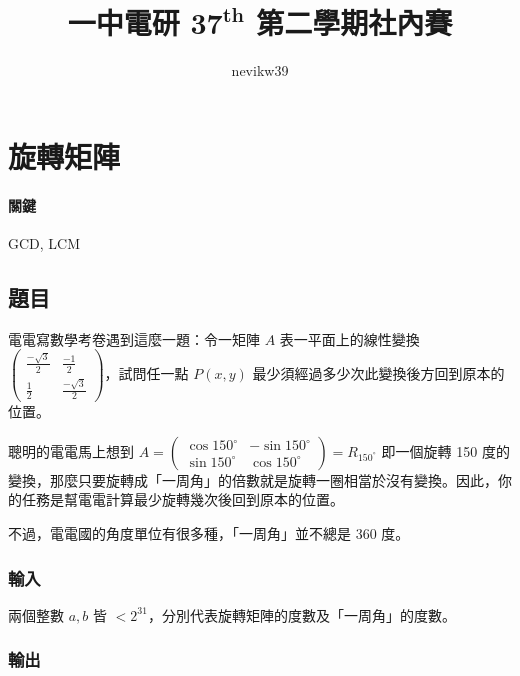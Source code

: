 \documentclass[a4paper,10pt]{article}
\title{\fontseries{b}一中電研 $\mathbf{37^{th}}$ 第二學期社內賽 \enspace {\huge\fontseries{eb}\selectfont 題目解析}}
\author{\fontshape{it}nevikw39}
\begin{document}
\maketitle

\begin{abstract}


\end{abstract}

\section{旋轉矩陣}

\paragraph{關鍵} GCD, LCM

\subsection{題目}

電電寫數學考卷遇到這麼一題：令一矩陣 $A$ 表一平面上的線性變換 $\begin{pmatrix} \frac{-\sqrt{3}}{2} & \frac{-1}{2}\\ \frac{1}{2} & \frac{-\sqrt{3}}{2} \end{pmatrix}$，試問任一點 $P(x, y)$ 最少須經過多少次此變換後方回到原本的位置。

聰明的電電馬上想到 $A = \begin{pmatrix} \cos 150^{\circ} & -\sin 150^{\circ}\\ \sin 150^{\circ} & \cos 150^{\circ} \end{pmatrix} = R_{150^{\circ}}$ 即一個旋轉 150 度的變換，那麼只要旋轉成「一周角」的倍數就是旋轉一圈相當於沒有變換。因此，你的任務是幫電電計算最少旋轉幾次後回到原本的位置。

不過，電電國的角度單位有很多種，「一周角」並不總是 360 度。

\subsubsection{輸入}

兩個整數 $a, b$ 皆 $< 2^{31}$，分別代表旋轉矩陣的度數及「一周角」的度數。

\subsubsection{輸出}
\end{document}
